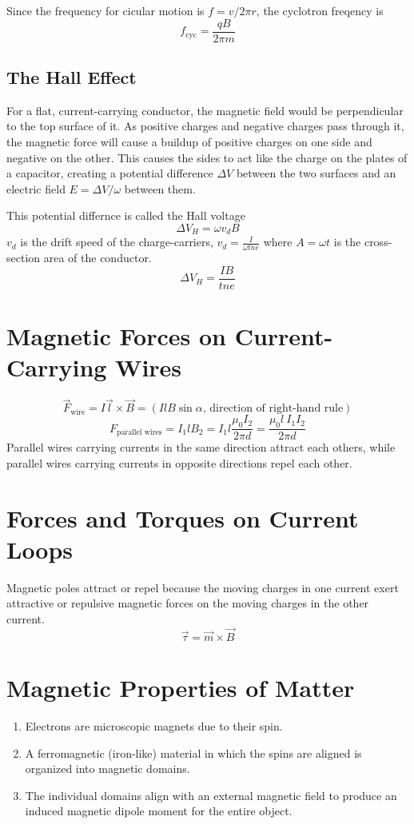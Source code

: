 \documentclass{article}
\begin{document}
Since the frequency for cicular motion is $f=v/2\pi r$, the cyclotron freqency is
\[f_\text{cyc}=\frac{qB}{2\pi m}\]

\subsection*{The Hall Effect}
For a flat, current-carrying conductor, the magnetic field would be perpendicular to the top
surface of it. As positive charges and negative charges pass through it, the magnetic force will
cause a buildup of positive charges on one side and negative on the other. This causes the sides to
act like the charge on the plates of a capacitor, creating a potential difference $\Delta V$
between the two surfaces and an electric field $E=\Delta V/\omega$ between them.
\vspace{1em}

This potential differnce is called the Hall voltage
\[\Delta V_H=\omega v_d B\]
$v_d$ is the drift speed of the charge-carriers, $v_d=\frac{I}{\omega t n e}$ where $A=\omega t$ is
the cross-section area of the conductor.
\[\Delta V_H=\frac{IB}{tne}\]

\section*{Magnetic Forces on Current-Carrying Wires}
\[\vec{F}_\text{wire}=I\vec{l}\times \vec{B}=(IlB\sin\alpha\text{, direction of right-hand rule})\]
\[F_\text{parallel wires}=I_1 l B_2 = I_1 l \frac{\mu_0 I_2}{2\pi d}=\frac{\mu_0 l \: I_1 I_2}
{2\pi d}\]
Parallel wires carrying currents in the same direction attract each others, while parallel wires
carrying currents in opposite directions repel each other.

\section*{Forces and Torques on Current Loops}
Magnetic poles attract or repel because the moving charges in one current exert attractive or
repulsive magnetic forces on the moving charges in the other current.
\[\vec{\tau}=\vec{m}\times\vec{B}\]

\section*{Magnetic Properties of Matter}
\begin{enumerate}
    \item Electrons are microscopic magnets due to their spin.
    \item A ferromagnetic (iron-like) material in which the spins are aligned is organized into
    magnetic domains.
    \item The individual domains align with an external magnetic field to produce an induced
    magnetic dipole moment for the entire object.
\end{enumerate}
\end{document}
